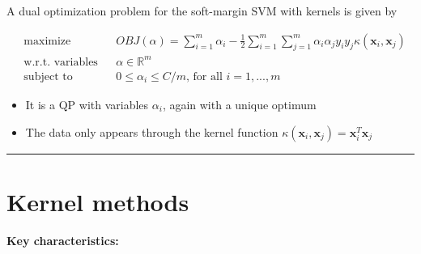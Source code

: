 \documentclass[12pt, a4paper]{article}
\let\stdsection\section
\renewcommand\section{\newpage\stdsection} %
\begin{document}
A dual optimization problem for the soft-margin SVM with kernels is given by

\begin{equation*}
\begin{aligned}
& \text{maximize}
& & OBJ(\alpha) = \sum_{i=1}^m \alpha_i - \frac{1}{2} \sum_{i=1}^m \sum_{j=1}^m \alpha_i \alpha_j y_i y_j \kappa(\mathbf{x}_i, \mathbf{x}_j) \\
& \text{w.r.t. variables}
& & \alpha \in \mathbb{R}^m \\
& \text{subject to}
& & 0 \leq \alpha_i \leq C/m \text{, for all } i = 1, ..., m
\end{aligned}
\end{equation*}

\begin{itemize}
  \item It is a QP with variables $\alpha_i$, again with a unique optimum
  \item The data only appears through the kernel function $\kappa(\mathbf{x}_i, \mathbf{x}_j) = \mathbf{x}_i^T \mathbf{x}_j$
\end{itemize}




\begin{center}\rule{3in}{0.4pt}\end{center}




















\section{Kernel methods}\label{Kernel-methods}


\textbf{Key characteristics:}
\end{document}
